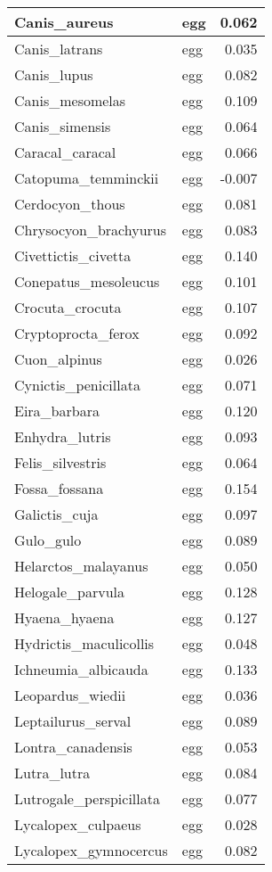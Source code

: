 \begin{table}
\begin{tabular}[t]{l|l|r}
\hline
Canis\_aureus & egg & 0.062\\
\hline
Canis\_latrans & egg & 0.035\\
\hline
Canis\_lupus & egg & 0.082\\
\hline
Canis\_mesomelas & egg & 0.109\\
\hline
Canis\_simensis & egg & 0.064\\
\hline
Caracal\_caracal & egg & 0.066\\
\hline
Catopuma\_temminckii & egg & -0.007\\
\hline
Cerdocyon\_thous & egg & 0.081\\
\hline
Chrysocyon\_brachyurus & egg & 0.083\\
\hline
Civettictis\_civetta & egg & 0.140\\
\hline
Conepatus\_mesoleucus & egg & 0.101\\
\hline
Crocuta\_crocuta & egg & 0.107\\
\hline
Cryptoprocta\_ferox & egg & 0.092\\
\hline
Cuon\_alpinus & egg & 0.026\\
\hline
Cynictis\_penicillata & egg & 0.071\\
\hline
Eira\_barbara & egg & 0.120\\
\hline
Enhydra\_lutris & egg & 0.093\\
\hline
Felis\_silvestris & egg & 0.064\\
\hline
Fossa\_fossana & egg & 0.154\\
\hline
Galictis\_cuja & egg & 0.097\\
\hline
Gulo\_gulo & egg & 0.089\\
\hline
Helarctos\_malayanus & egg & 0.050\\
\hline
Helogale\_parvula & egg & 0.128\\
\hline
Hyaena\_hyaena & egg & 0.127\\
\hline
Hydrictis\_maculicollis & egg & 0.048\\
\hline
Ichneumia\_albicauda & egg & 0.133\\
\hline
Leopardus\_wiedii & egg & 0.036\\
\hline
Leptailurus\_serval & egg & 0.089\\
\hline
Lontra\_canadensis & egg & 0.053\\
\hline
Lutra\_lutra & egg & 0.084\\
\hline
Lutrogale\_perspicillata & egg & 0.077\\
\hline
Lycalopex\_culpaeus & egg & 0.028\\
\hline
Lycalopex\_gymnocercus & egg & 0.082\\

\end{tabular}
\end{table}
